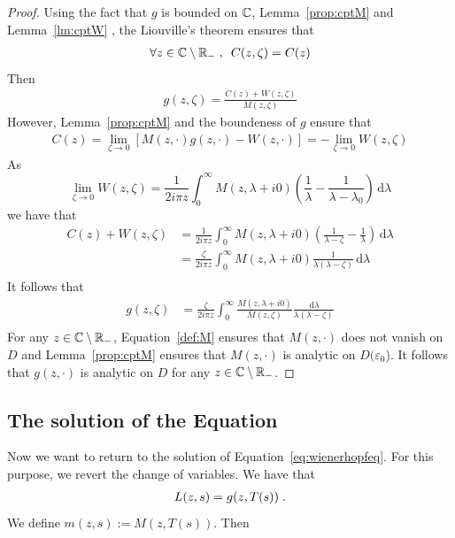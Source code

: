 \documentclass[11pt]{amsart}
\newcommand{\diff}{\,\mathrm{d}}
\begin{document}
\begin{proof}
Using the fact that $g$ is bounded on $\mathbb{C}$, Lemma~\ref{prop:cptM} and Lemma~\ref{lm:cptW}
, the Liouville's theorem ensures that
\begin{align*}
    \forall z \in \mathbb{C} \setminus \mathbb{R}_-
    \; , \enspace
    C(z,\zeta) = C(z)
\end{align*}
Then 
\begin{align}
    g(z,\zeta) = \frac{C(z)+W(z,\zeta)}{M(z,\zeta)}
\end{align}
However, Lemma~\ref{prop:cptM} and the boundeness of $g$ ensure that
\begin{align}
C(z) 
= \lim_{\zeta \to 0}[M(z,\cdot)g(z,\cdot) - W(z,\cdot)] 
= -\lim_{\zeta \to 0}W(z,\zeta)
\end{align}
As
$$ \lim_{\zeta \to 0}W(z,\zeta) 
= \frac{1}{2i\pi z}\int_0^\infty  {M(z,\lambda+i0)}\left( \frac{1}{\lambda} - \frac{1}{\lambda-\lambda_0}\right) \diff \lambda $$
we have that
\begin{align*}
    C(z) + W(z,\zeta)
    &= 
    \frac{1}{2i \pi z}\int_0^\infty  {M(z,\lambda+i0)}\left( \frac{1}{\lambda-\zeta}-\frac{1}{\lambda}\right) \diff \lambda \\
    &= 
    \frac{\zeta}{2i\pi z}\int_0^\infty  {M(z,\lambda+i0)}\frac{1}{\lambda(\lambda-\zeta)} \diff \lambda \\
\end{align*}
It follows that 
\begin{align*}
    g(z,\zeta) 
    &= 
    \frac{\zeta}{2i \pi z}\int_0^\infty  \frac{M(z,\lambda+i0)}{M(z,\zeta)} \frac{\diff \lambda}{\lambda(\lambda-\zeta)} \\
\end{align*}
For any $z \in \mathbb{C} \setminus \mathbb{R}_-$, Equation~\eqref{def:M} ensures that $M(z, \cdot)$ does not vanish on $D$ and Lemma~\ref{prop:cptM} ensures that $M(z, \cdot)$ is analytic on $D(\varepsilon_0$). It follows that $g(z, \cdot)$ is analytic on $D$ for any $z \in \mathbb{C} \setminus \mathbb{R}_-$.

\end{proof}

\subsection{The solution of the Equation}
Now we want to return to the solution of Equation~\eqref{eq:wienerhopfeq}. For this purpose, we revert the change of variables. We have that 
\begin{align}
    L(z,s) = g(z, T(s)) 
    \; .
\end{align}
We define $m(z,s) := M(z, T(s))$. Then
\end{document}
